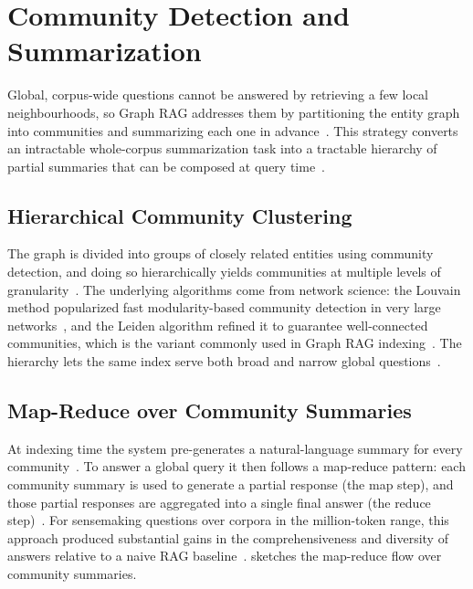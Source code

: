 \section{Community Detection and Summarization}
\label{sec:gr-community}

Global, corpus-wide questions cannot be answered by retrieving a few local
neighbourhoods, so Graph RAG addresses them by partitioning the entity graph into
communities and summarizing each one in advance~\cite{edge2024graphrag}. This
strategy converts an intractable whole-corpus summarization task into a tractable
hierarchy of partial summaries that can be composed at query
time~\cite{edge2024graphrag}.

\subsection{Hierarchical Community Clustering}

The graph is divided into groups of closely related entities using community
detection, and doing so hierarchically yields communities at multiple levels of
granularity~\cite{edge2024graphrag}. The underlying algorithms come from network
science: the Louvain method popularized fast modularity-based community detection
in very large networks~\cite{blondel2008louvain}, and the Leiden algorithm refined
it to guarantee well-connected communities, which is the variant commonly used in
Graph RAG indexing~\cite{traag2019leiden}. The hierarchy lets the same index serve
both broad and narrow global questions~\cite{edge2024graphrag}.

\subsection{Map-Reduce over Community Summaries}

At indexing time the system pre-generates a natural-language summary for every
community~\cite{edge2024graphrag}. To answer a global query it then follows a
map-reduce pattern: each community summary is used to generate a partial response
(the map step), and those partial responses are aggregated into a single final
answer (the reduce step)~\cite{edge2024graphrag}. For sensemaking questions over
corpora in the million-token range, this approach produced substantial gains in
the comprehensiveness and diversity of answers relative to a naive RAG
baseline~\cite{edge2024graphrag}.  sketches the
map-reduce flow over community summaries.

